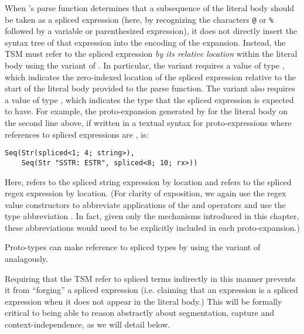When 's parse function determines that a subsequence of the literal body should be taken as a spliced expression (here, by recognizing the characters \lstinline{@} or \lstinline{%} followed by a variable or parenthesized expression), it does not directly insert the syntax tree of that expression into the encoding of the expansion. Instead, 
the TSM must refer to the spliced expression \emph{by its relative location} within the literal body using the  variant of . 
In particular, the  variant requires a value of type , which indicates the zero-indexed location of the spliced expression relative to the start of the literal body provided to the parse function. 
The  variant also requires a value of type , which indicates the type that the spliced expression is expected to have. 
For example, the proto-expansion generated by  for the literal body on the second line above, if written in a  textual syntax for proto-expressions where references to spliced expressions are , is:
\begin{lstlisting}[numbers=none]
Seq(Str(spliced<1; 4; string>), 
    Seq(Str "SSTR: ESTR", spliced<8; 10; rx>))
\end{lstlisting}
 Here,  refers to the spliced string expression  by location and  refers to the spliced regex expression  by location. 
(For clarity of exposition, we again use the regex value constructors to abbreviate applications of the  and  operators and use the type abbreviation . In fact, given only the mechanisms introduced in this chapter, these abbreviations would need to be explicitly included in each proto-expansion.)

Proto-types can make reference to spliced types by using the  variant of  analagously.

Requiring that the TSM refer to spliced terms indirectly in this manner prevents it from ``forging'' a spliced expression (i.e. claiming that an expression is a spliced expression when it does not appear in the literal body.) This will be formally critical to being able to reason abstractly about segmentation, capture and context-independence, as we will detail below.



